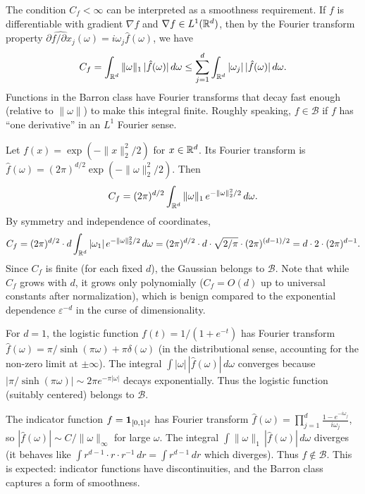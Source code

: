 \documentclass[11pt,a4paper]{article}
\begin{document}
\begin{remark}
\label{rem:barron-smoothness}
The condition $C_f < \infty$ can be interpreted as a smoothness
requirement.  If $f$ is differentiable with gradient $\nabla f$ and
$\nabla f \in L^1(\mathbb{R}^d)$, then by the Fourier transform property
$\widehat{\partial f / \partial x_j}(\omega) = i\omega_j \hat{f}(\omega)$,
we have
\[
  C_f = \int_{\mathbb{R}^d} \|\omega\|_1 \, |\hat{f}(\omega)| \, d\omega
  \le \sum_{j=1}^d \int_{\mathbb{R}^d} |\omega_j| \, |\hat{f}(\omega)| \, d\omega.
\]
Functions in the Barron class have Fourier transforms that decay fast
enough (relative to $\|\omega\|$) to make this integral finite.  Roughly
speaking, $f \in \mathcal{B}$ if $f$ has ``one derivative'' in an $L^1$
Fourier sense.
\end{remark}

\begin{example}
\label{ex:gaussian}
Let $f(x) = \exp(-\|x\|_2^2 / 2)$ for $x \in \mathbb{R}^d$.  Its Fourier
transform is $\hat{f}(\omega) = (2\pi)^{d/2} \exp(-\|\omega\|_2^2 / 2)$.
Then
\[
  C_f = (2\pi)^{d/2} \int_{\mathbb{R}^d} \|\omega\|_1 \,
  e^{-\|\omega\|_2^2/2} \, d\omega.
\]
By symmetry and independence of coordinates,
\[
  C_f = (2\pi)^{d/2} \cdot d \int_{\mathbb{R}^d} |\omega_1| \,
  e^{-\|\omega\|_2^2/2} \, d\omega
  = (2\pi)^{d/2} \cdot d \cdot \sqrt{2/\pi} \cdot (2\pi)^{(d-1)/2}
  = d \cdot 2 \cdot (2\pi)^{d-1}.
\]
Since $C_f$ is finite (for each fixed $d$), the Gaussian belongs to
$\mathcal{B}$.  Note that while $C_f$ grows with $d$, it grows only
polynomially ($C_f = O(d)$ up to universal constants after normalization),
which is benign compared to the exponential dependence $\varepsilon^{-d}$
in the curse of dimensionality.
\end{example}

\begin{example}
\label{ex:logistic}
For $d = 1$, the logistic function $f(t) = 1/(1 + e^{-t})$ has Fourier
transform $\hat{f}(\omega) = \pi / \sinh(\pi \omega) + \pi \delta(\omega)$
(in the distributional sense, accounting for the non-zero limit at
$\pm\infty$).  The integral $\int |\omega| \, |\hat{f}(\omega)| \,
d\omega$ converges because $|\pi / \sinh(\pi\omega)| \sim 2\pi e^{-\pi
|\omega|}$ decays exponentially.  Thus the logistic function (suitably
centered) belongs to $\mathcal{B}$.
\end{example}

\begin{example}
\label{ex:indicator-not-barron}
The indicator function $f = \mathbf{1}_{[0,1]^d}$ has Fourier transform
$\hat{f}(\omega) = \prod_{j=1}^d \frac{1 - e^{-i\omega_j}}{i\omega_j}$,
so $|\hat{f}(\omega)| \sim C / \|\omega\|_\infty$ for large $\omega$.
The integral $\int \|\omega\|_1 \, |\hat{f}(\omega)| \, d\omega$
diverges (it behaves like $\int r^{d-1} \cdot r \cdot r^{-1} \, dr =
\int r^{d-1} \, dr$ which diverges).  Thus $f \notin \mathcal{B}$.
This is expected: indicator functions have discontinuities, and the Barron
class captures a form of smoothness.
\end{example}
\end{document}
